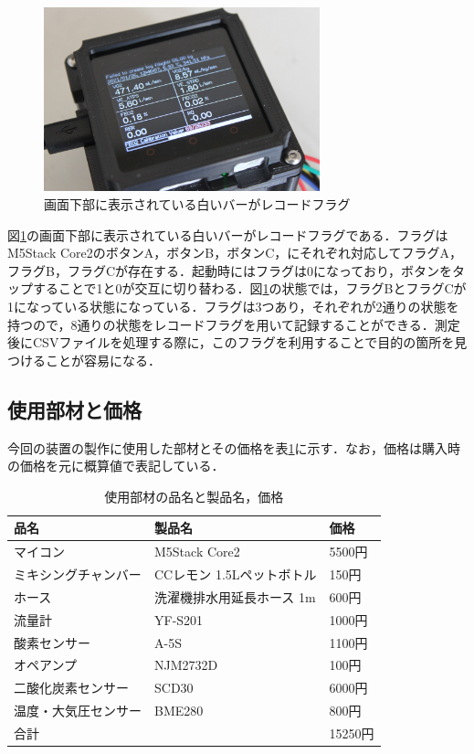 \begin{figure}[H]
  \begin{center}
    \includegraphics[width=8cm]{fig/record_flag}
    \caption{画面下部に表示されている白いバーがレコードフラグ}
    \label{fig:record_flag}
  \end{center}
\end{figure}

図\ref{fig:record_flag}の画面下部に表示されている白いバーがレコードフラグである．フラグはM5Stack Core2のボタンA，ボタンB，ボタンC，にそれぞれ対応してフラグA，フラグB，フラグCが存在する．起動時にはフラグは0になっており，ボタンをタップすることで1と0が交互に切り替わる．図\ref{fig:record_flag}の状態では，フラグBとフラグCが1になっている状態になっている．フラグは3つあり，それぞれが2通りの状態を持つので，8通りの状態をレコードフラグを用いて記録することができる．測定後にCSVファイルを処理する際に，このフラグを利用することで目的の箇所を見つけることが容易になる．

\subsection{使用部材と価格}

今回の装置の製作に使用した部材とその価格を表\ref{tb:price_of_material}に示す．なお，価格は購入時の価格を元に概算値で表記している．

\begin{table}[]
\begin{center}
\caption{使用部材の品名と製品名，価格}
\label{tb:price_of_material}
\begin{tabular}{|l|l|l|}
\hline
品名         & 製品名              & 価格     \\ \hline
マイコン       & M5Stack Core2    & 5500円  \\ \hline
ミキシングチャンバー & CCレモン 1.5Lペットボトル & 150円   \\ \hline
ホース        & 洗濯機排水用延長ホース 1m      & 600円   \\ \hline
流量計        & YF-S201          & 1000円  \\ \hline
酸素センサー     & A-5S             & 1100円  \\ \hline
オペアンプ      & NJM2732D         & 100円   \\ \hline
二酸化炭素センサー  & SCD30            & 6000円  \\ \hline
温度・大気圧センサー & BME280           & 800円   \\ \hline
\multicolumn{2}{|l|}{合計}      & 15250円 \\ \hline
\end{tabular}
\end{center}
\end{table}

